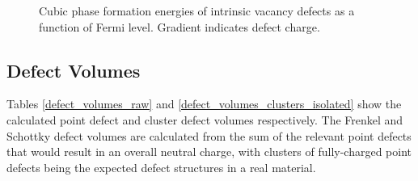 \begin{figure}[ht]
\begin{center}
		\caption{Cubic phase formation energies of intrinsic vacancy defects as a function of Fermi level. Gradient indicates defect charge.}
		\label{figure:cubicvacancies}
	\end{center}
\end{figure}


\subsection{Defect Volumes}

Tables \ref{defect_volumes_raw} and \ref{defect_volumes_clusters_isolated} show the calculated point defect and cluster defect volumes respectively. The Frenkel and Schottky defect volumes are calculated from the sum of the relevant point defects that would result in an overall neutral charge, with clusters of fully-charged point defects being the expected defect structures in a real material.

